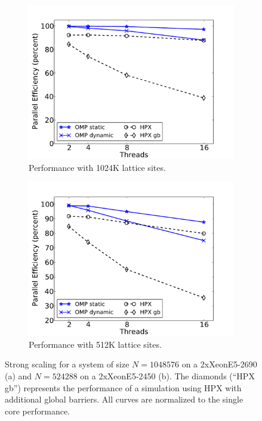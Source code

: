 \documentclass[10pt]{elsarticle}
\begin{document}
\begin{figure}
 \begin{subfigure}[b]{0.49\textwidth}
  \centering
  \includegraphics[width=\textwidth]{ariel_scaling_1024K.pdf}\hfill
  \caption{Performance with 1024K lattice sites.} 
  \label{fig:scaling_ariel_1024K}
 \end{subfigure}
 \begin{subfigure}[b]{0.49\textwidth}
  \centering
  \includegraphics[width=\textwidth]{marvin_scaling_512K.pdf}\hfill
  \caption{Performance with 512K lattice sites.} 
  \label{fig:scaling_marvin_512K}
 \end{subfigure}
 \caption{Strong scaling for a system of size $N=1048576$ on a 2xXeonE5-2690 (a) and $N=524288$ on a 2xXeonE5-2450 (b). The diamonds (``HPX gb'') represents the performance of a simulation using HPX with additional global barriers. All curves are normalized to the single core performance.
 }
 \label{fig:scaling1D}
\end{figure}
\end{document}
